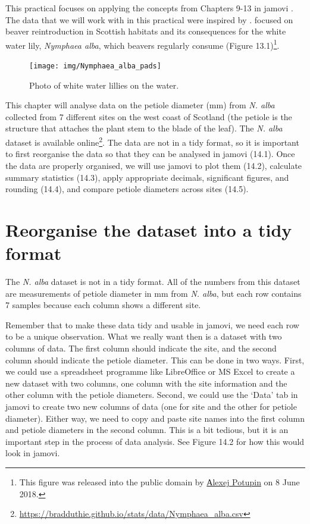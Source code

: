 \documentclass[
]{scrbook}
\begin{document}
This practical focuses on applying the concepts from Chapters 9-13 in jamovi \citep{Jamovi2022}.
The data that we will work with in this practical were inspired by \citet{Law2014}.
\citet{Law2014} focused on beaver reintroduction in Scottish habitats and its consequences for the white water lily, \emph{Nymphaea alba}, which beavers regularly consume (Figure 13.1)\footnote{This figure was released into the public domain by \href{https://commons.wikimedia.org/wiki/File:Nymphaea_alba._Reader.jpg}{Аlexej Potupin} on 8 June 2018.}.

\begin{figure}
\texttt{[image: img/Nymphaea\_alba\_pads]} \caption{Photo of white water lillies on the water.}\label{fig:unnamed-chunk-47}
\end{figure}

This chapter will analyse data on the petiole diameter (mm) from \emph{N. alba} collected from 7 different sites on the west coast of Scotland (the petiole is the structure that attaches the plant stem to the blade of the leaf).
The \emph{N. alba} dataset is available online\footnote{\url{https://bradduthie.github.io/stats/data/Nymphaea_alba.csv}}.
The data are not in a tidy format, so it is important to first reorganise the data so that they can be analysed in jamovi (14.1).
Once the data are properly organised, we will use jamovi to plot them (14.2), calculate summary statistics (14.3), apply appropriate decimals, significant figures, and rounding (14.4), and compare petiole diameters across sites (14.5).

\hypertarget{reorganise-the-dataset-into-a-tidy-format}{%
\section{Reorganise the dataset into a tidy format}\label{reorganise-the-dataset-into-a-tidy-format}}

The \emph{N. alba} dataset is not in a tidy format.
All of the numbers from this dataset are measurements of petiole diameter in mm from \emph{N. alba}, but each row contains 7 samples because each column shows a different site.

Remember that to make these data tidy and usable in jamovi, we need each row to be a unique observation.
What we really want then is a dataset with two columns of data.
The first column should indicate the site, and the second column should indicate the petiole diameter.
This can be done in two ways.
First, we could use a spreadsheet programme like LibreOffice or MS Excel to create a new dataset with two columns, one column with the site information and the other column with the petiole diameters.
Second, we could use the `Data' tab in jamovi to create two new columns of data (one for site and the other for petiole diameter).
Either way, we need to copy and paste site names into the first column and petiole diameters in the second column.
This is a bit tedious, but it is an important step in the process of data analysis.
See Figure 14.2 for how this would look in jamovi.
\end{document}
